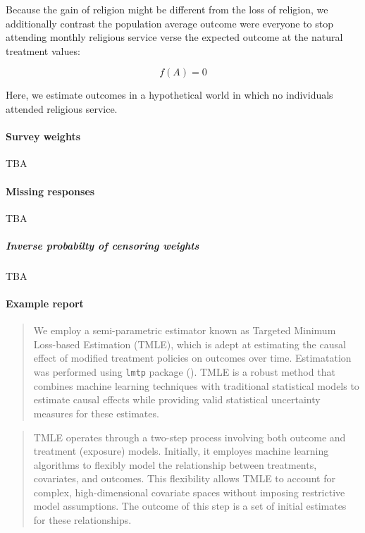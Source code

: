 \documentclass[
  singlecolumn]{article}
\let\oldparagraph\paragraph
\renewcommand{\paragraph}[1]{\oldparagraph{#1}\mbox{}}
\let\oldsubparagraph\subparagraph
\renewcommand{\subparagraph}[1]{\oldsubparagraph{#1}\mbox{}}
\begin{document}
Because the gain of religion might be different from the loss of
religion, we additionally contrast the population average outcome were
everyone to stop attending monthly religious service verse the expected
outcome at the natural treatment values:

\[f(A) = 0 \]

Here, we estimate outcomes in a hypothetical world in which no
individuals attended religious service.

\paragraph{Survey weights}\label{survey-weights}

TBA

\paragraph{Missing responses}\label{missing-responses}

TBA

\subparagraph{Inverse probabilty of censoring
weights}\label{inverse-probabilty-of-censoring-weights}

TBA

\paragraph{Example report}\label{example-report}

\begin{quote}
We employ a semi-parametric estimator known as Targeted Minimum
Loss-based Estimation (TMLE), which is adept at estimating the causal
effect of modified treatment policies on outcomes over time.
Estimatation was performed using \texttt{lmtp} package
(). TMLE is a robust
method that combines machine learning techniques with traditional
statistical models to estimate causal effects while providing valid
statistical uncertainty measures for these estimates.
\end{quote}

\begin{quote}
TMLE operates through a two-step process involving both outcome and
treatment (exposure) models. Initially, it employes machine learning
algorithms to flexibly model the relationship between treatments,
covariates, and outcomes. This flexibility allows TMLE to account for
complex, high-dimensional covariate spaces without imposing restrictive
model assumptions. The outcome of this step is a set of initial
estimates for these relationships.
\end{quote}
\end{document}
